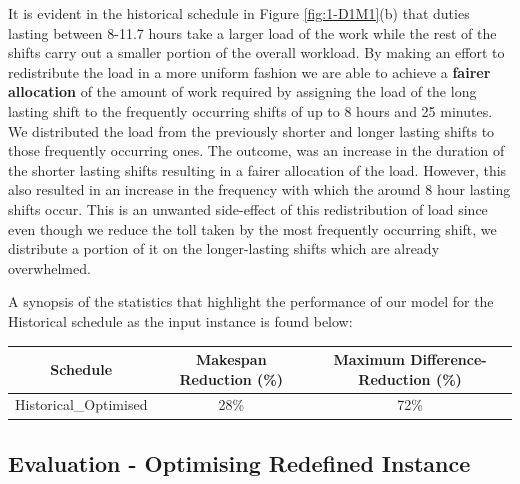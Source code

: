 \vspace{\baselineskip}
\noindent
It is evident in the historical schedule in Figure \ref{fig:1-D1M1}(b) that duties lasting between 8-11.7 hours take a larger load of the work while the rest of the shifts carry out a smaller portion of the overall workload. By making an effort to redistribute the load in a more uniform fashion we are able to achieve a \textbf{fairer allocation} of the amount of work required by assigning the load of the long lasting shift to the frequently occurring shifts of up to 8 hours and 25 minutes. We distributed the load from the previously shorter and longer lasting shifts to those frequently occurring ones. The outcome, was an increase in the duration of the shorter lasting shifts resulting in a fairer allocation of the load. However, this also resulted in an increase in the frequency with which the around 8 hour lasting shifts occur. This is an unwanted side-effect of this redistribution of load since even though we reduce the toll taken by the most frequently occurring shift, we distribute a portion of it on the longer-lasting shifts which are already overwhelmed. 

\vspace{\baselineskip}
\noindent
A synopsis of the statistics that highlight the performance of our model for the Historical schedule as the input instance is found below:

\begin{table}[h]
\small
    \centering 
\begin{tabular}{c|c|c}
        \textbf{Schedule} & \textbf{Makespan Reduction (\%)} & \textbf{Maximum Difference-Reduction \cite{maxdif} (\%)} \\
        \hline
         Historical\_Optimised & 28\% & 72\% \\
\end{tabular}
\end{table}





\subsection*{Evaluation - Optimising Redefined Instance}

